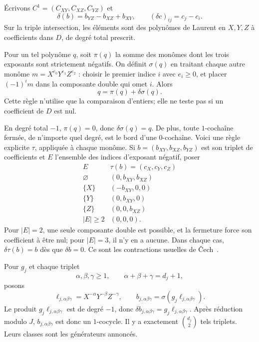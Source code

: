 \documentclass[11pt]{amsart}
\theoremstyle{remark}
\begin{document}
Écrivons $C^1=(C_{XY},C_{XZ},C_{YZ})$ et
\[
 \delta(b)=b_{YZ}-b_{XZ}+b_{XY},\qquad
 (\delta c)_{ij}=c_j-c_i.
\]
Sur la triple intersection, les éléments sont des polynômes de Laurent
en $X,Y,Z$ à coefficients dans $D$, de degré total prescrit.

Pour un tel polynôme $q$, soit $\pi(q)$ la somme des monômes dont
les trois exposants sont strictement négatifs. On définit $\sigma(q)$
en traitant chaque autre monôme $m=X^{e_0}Y^{e_1}Z^{e_2}$ : choisir
le premier indice $i$ avec $e_i\geq0$, et placer $(-1)^i m$ dans la
composante double qui omet $i$. Alors
\[
 q=\pi(q)+\delta\sigma(q).
 \tag{1}
\]
Cette règle n'utilise que la comparaison d'entiers; elle ne teste pas
si un coefficient de $D$ est nul.

En degré total $-1$, $\pi(q)=0$, donc $\delta\sigma(q)=q$.
De plus, toute $1$-cochaîne fermée, de n'importe quel degré, est le
bord d'une $0$-cochaîne. Voici une règle explicite $\tau$, appliquée
à chaque monôme. Si $b=(b_{XY},b_{XZ},b_{YZ})$ est son triplet de
coefficients et $E$ l'ensemble des indices d'exposant négatif, poser
\[
\begin{array}{c|c}
 E&\tau(b)=(c_X,c_Y,c_Z)\\\hline
 \varnothing&(0,b_{XY},b_{XZ})\\
 \{X\}&(-b_{XY},0,0)\\
 \{Y\}&(0,b_{XY},0)\\
 \{Z\}&(0,0,b_{XZ})\\
 |E|\geq2&(0,0,0).
\end{array}
\]
Pour $|E|=2$, une seule composante double est possible, et la
fermeture force son coefficient à être nul; pour $|E|=3$, il n'y
en a aucune. Dans chaque cas, $\delta\tau(b)=b$ dès que $\delta b=0$.
Ce sont les contractions usuelles de Čech~\cite{proj}.

Pour $g_j$ et chaque triplet
\[
 \alpha,\beta,\gamma\geq1,\qquad
 \alpha+\beta+\gamma=d_j+1,
\]
posons
\[
 \ell_{j,\alpha\beta\gamma}=X^{-\alpha}Y^{-\beta}Z^{-\gamma},
 \qquad
 b_{j,\alpha\beta\gamma}=\sigma(g_j\ell_{j,\alpha\beta\gamma}).
\]
Le produit $g_j\ell_{j,\alpha\beta\gamma}$ est de degré $-1$,
donc $\delta b_{j,\alpha\beta\gamma}=g_j\ell_{j,\alpha\beta\gamma}$.
Après réduction modulo $J$, $b_{j,\alpha\beta\gamma}$ est donc
un $1$-cocycle. Il y a exactement $\binom{d_j}{2}$ tels triplets.
Leurs classes sont les générateurs annoncés.
\end{document}
